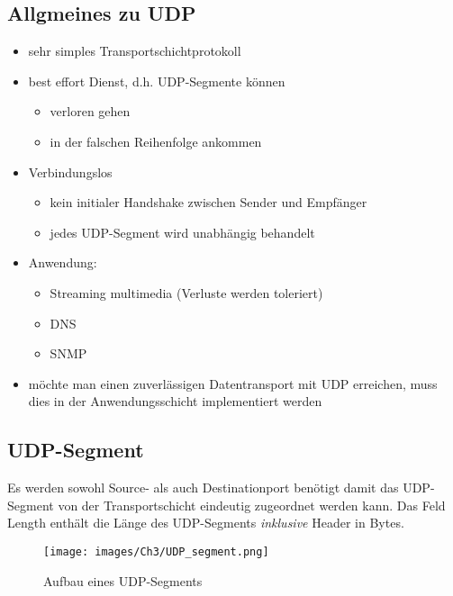 \subsection{Allgmeines zu UDP}
\begin{itemize}
    \item sehr simples Transportschichtprotokoll
    \item best effort Dienst, d.h. UDP-Segmente können
            \begin{itemize}
                \item verloren gehen
                \item in der falschen Reihenfolge ankommen
            \end{itemize}
    \item Verbindungslos
            \begin{itemize}
                \item kein initialer Handshake zwischen Sender und Empfänger
                \item jedes UDP-Segment wird unabhängig behandelt
            \end{itemize}
    \item Anwendung:
            \begin{itemize}
                \item Streaming multimedia (Verluste werden toleriert)
                \item DNS
                \item SNMP
            \end{itemize}
    \item möchte man einen zuverlässigen Datentransport mit UDP erreichen, muss dies in der Anwendungsschicht implementiert werden    
\end{itemize}

\subsection{UDP-Segment}
Es werden sowohl Source- als auch Destinationport benötigt damit das UDP-Segment von der Transportschicht eindeutig zugeordnet werden kann. Das Feld Length enthält die Länge des UDP-Segments \emph{inklusive} Header in Bytes.
\begin{figure}[H]
    \centering
    \texttt{[image: images/Ch3/UDP\_segment.png]}
    \caption{Aufbau eines UDP-Segments}
    \label{Ch03-UDP_segment}
\end{figure}

